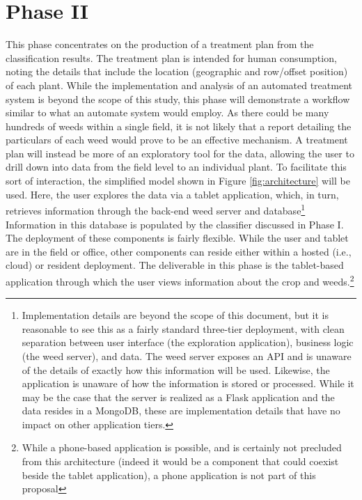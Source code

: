 \documentclass[12pt]{article}
\begin{document}
\section{Phase II}
This phase concentrates on the production of a treatment plan from the classification results. The treatment plan is intended for human consumption, noting the details that include the location (geographic and row/offset position) of each plant. While the implementation and analysis of an automated treatment system is beyond the scope of this study, this phase will demonstrate a workflow similar to what an automate system would employ.
As there could be many hundreds of weeds within a single field, it is not likely that a report detailing the particulars of each weed would prove to be an effective mechanism. A treatment plan will instead be more of an exploratory tool for the data, allowing the user to drill down into data from the field level to an individual plant. To facilitate this sort of interaction, the simplified model shown in Figure \ref{fig:architecture} will be used. Here, the user explores the data via a tablet application, which, in turn, retrieves information through the back-end weed server and database\footnote{Implementation details are beyond the scope of this document, but it is reasonable to see this as a fairly standard three-tier deployment, with clean separation between user interface (the exploration application), business logic (the weed server), and data. The weed server exposes an API and is unaware of the details of exactly how this information will be used. Likewise, the application is unaware of how the information is stored or processed. While it may be the case that the server is realized as a Flask application and the data resides in a MongoDB, these are implementation details that have no impact on other application tiers.} Information in this database is populated by the classifier discussed in Phase I. The deployment of these components is fairly flexible.  While the user and tablet are in the field or office, other components can reside either within a hosted (i.e., cloud) or resident deployment. The deliverable in this phase is the tablet-based application through which the user views information about the crop and weeds.\footnote{While a phone-based application is possible, and is certainly not precluded from this architecture (indeed it would be a component that could coexist beside the tablet application), a phone application is not part of this proposal}
\end{document}
